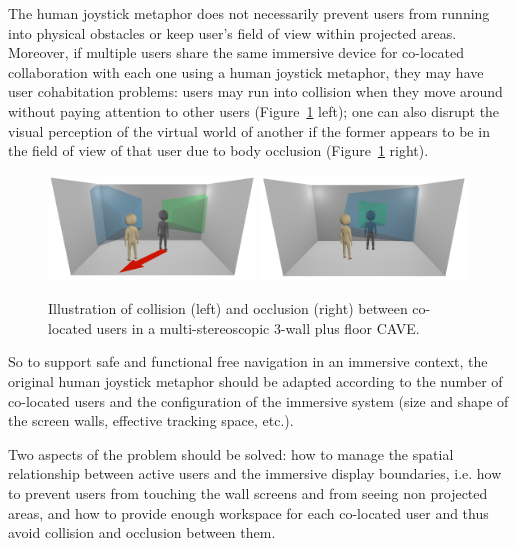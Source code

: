 The human joystick metaphor does not necessarily prevent users from running into physical obstacles or keep user's field of view within projected areas. Moreover, if multiple users share the same immersive device for co-located collaboration with each one using a human joystick metaphor, they may have user cohabitation problems: users may run into collision when they move around without paying attention to other users (Figure~\ref{fig:3_illustration} left); one can also disrupt the visual perception of the virtual world of another if the former appears to be in the field of view of that user due to body occlusion (Figure~\ref{fig:3_illustration} right).

\begin{figure}[tb]
  \centering
  \includegraphics[width=0.49\textwidth]{figures/3_illu_col}
  \includegraphics[width=0.49\textwidth]{figures/3_illu_occ}
  \caption{\label{fig:3_illustration}Illustration of collision (left) and occlusion (right) between co-located users in a multi-stereoscopic 3-wall plus floor CAVE.}
\end{figure}

So to support safe and functional free navigation in an immersive context, the original human joystick metaphor should be adapted according to the number of co-located users and the configuration of the immersive system (size and shape of the screen walls, effective tracking space, etc.).

Two aspects of the problem should be solved: how to manage the spatial relationship between active users and the immersive display boundaries, i.e. how to prevent users from touching the wall screens and from seeing non projected areas, and how to provide enough workspace for each co-located user and thus avoid collision and occlusion between them.

